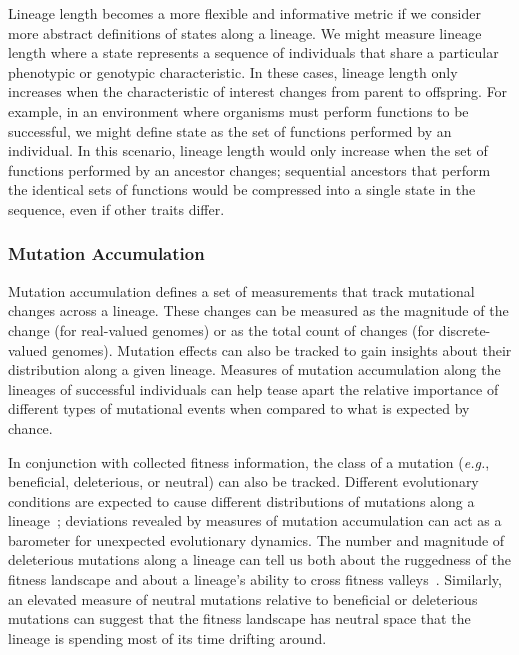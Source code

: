 \documentclass[letterpaper]{article}
\begin{document}
Lineage length becomes a more flexible and informative metric if we consider more abstract definitions of states along a lineage. We might measure lineage length where a state represents a sequence of individuals that share a particular phenotypic or genotypic characteristic. In these cases, lineage length only increases when the characteristic of interest changes from parent to offspring. For example, in an environment where organisms must perform functions to be successful, we might define state as the set of functions performed by an individual. In this scenario, lineage length would only increase when the set of functions performed by an ancestor changes; sequential ancestors that perform the identical sets of functions would be compressed into a single state in the sequence, even if other traits differ. 

\subsubsection{Mutation Accumulation}
Mutation accumulation defines a set of measurements that track mutational changes across a lineage. These changes can be measured as the magnitude of the change (for real-valued genomes) or as the total count of changes (for discrete-valued genomes). Mutation effects can also be tracked to gain insights about their distribution along a given lineage. Measures of mutation accumulation along the lineages of successful individuals can help tease apart the relative importance of different types of mutational events when compared to what is expected by chance. 

In conjunction with collected fitness information, the class of a mutation (\textit{e.g.}, beneficial, deleterious, or neutral) can also be tracked. Different evolutionary conditions are expected to cause different distributions of mutations along a lineage~\citep{barrick2013genome}; deviations revealed by measures of mutation accumulation can act as a barometer for unexpected evolutionary dynamics.  
The number and magnitude of deleterious mutations along a lineage can tell us both about the ruggedness of the fitness landscape and about a lineage's ability to cross fitness valleys~\citep{covert_experiments_2013}. 
Similarly, an elevated measure of neutral mutations relative to beneficial or deleterious mutations can suggest that the fitness landscape has neutral space that the lineage is spending most of its time drifting around. 
\end{document}
